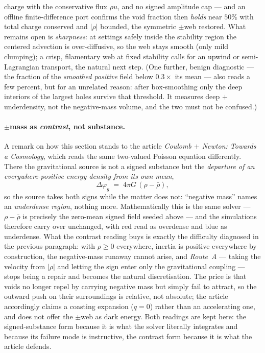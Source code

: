 charge with the conservative flux $\rho u$, and no signed amplitude cap --- and an offline finite-difference port
confirms the void fraction then \emph{holds} near $50\%$ with total charge conserved and $|\rho|$ bounded, the
symmetric $\pm$web restored. What remains open is \emph{sharpness}: at settings safely inside the stability region
the centered advection is over-diffusive, so the web stays smooth (only mild clumping); a crisp, filamentary web at
fixed stability calls for an upwind or semi-Lagrangian transport, the natural next step. (One further, benign diagnostic --- the fraction of the \emph{smoothed positive} field below
$0.3\times$ its mean --- also reads a few percent, but for an unrelated reason: after box-smoothing only the deep
interiors of the largest holes survive that threshold. It measures deep $+$underdensity, not the negative-mass
volume, and the two must not be confused.)

\paragraph{$\pm$mass as \emph{contrast}, not substance.} A remark on how this section stands to the article
\emph{Coulomb $+$ Newton: Towards a Cosmology}, which reads the same two-valued Poisson equation differently. There
the gravitational source is not a signed substance but the \emph{departure of an everywhere-positive energy density
from its own mean},
\begin{equation}\label{eq:contrastsource}
\Delta\varphi_g \;=\; 4\pi G\,(\rho-\bar\rho),
\end{equation}
so the source takes both signs while the matter does not: ``negative mass'' names an \emph{underdense region},
nothing more. Mathematically this is the same solver --- $\rho-\bar\rho$ is precisely the zero-mean signed field
seeded above --- and the simulations therefore carry over unchanged, with red read as overdense and blue as
underdense. What the contrast reading buys is exactly the difficulty diagnosed in the previous paragraph: with
$\rho\ge0$ everywhere, inertia is positive everywhere by construction, the negative-mass runaway cannot arise, and
\emph{Route~A} --- taking the velocity from $|\rho|$ and letting the sign enter only the gravitational coupling ---
stops being a repair and becomes the natural discretisation. The price is that voids no longer repel by carrying
negative mass but simply fail to attract, so the outward push on their surroundings is relative, not absolute; the
article accordingly claims a coasting expansion ($q=0$) rather than an accelerating one, and does not offer the
$\pm$web as dark energy. Both readings are kept here: the signed-substance form because it is what the solver
literally integrates and because its failure mode is instructive, the contrast form because it is what the article
defends.



